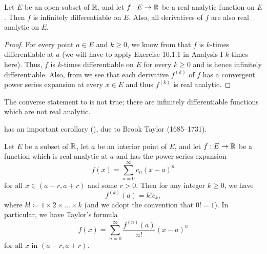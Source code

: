 \begin{cor}\label{ii:4.2.7}
  Let \(E\) be an open subset of \(\mathbb{R}\), and let \(f : E \to \mathbb{R}\) be a real analytic function on \(E\).
  Then \(f\) is infinitely differentiable on \(E\).
  Also, all derivatives of \(f\) are also real analytic on \(E\).
\end{cor}

\begin{proof}
  For every point \(a \in E\) and \(k \geq 0\), we know from  that \(f\) is \(k\)-times differentiable at \(a\)
  (we will have to apply Exercise 10.1.1 in Analysis I \(k\) times here).
  Thus, \(f\) is \(k\)-times differentiable on \(E\) for every \(k \geq 0\) and is hence infinitely differentiable.
  Also, from  we see that each derivative \(f^{(k)}\) of \(f\) has a convergent power series expansion at every \(x \in E\) and thus \(f^{(k)}\) is real analytic.
\end{proof}

\setcounter{thm}{8}
\begin{rmk}\label{ii:4.2.9}
  The converse statement to  is not true;
  there are infinitely differentiable functions which are not real analytic.
\end{rmk}

\begin{note}
   has an important corollary (), due to Brook Taylor (1685--1731).
\end{note}

\begin{cor}\label{ii:4.2.10}
  Let \(E\) be a subset of \(\mathbb{R}\), let \(a\) be an interior point of \(E\), and let \(f : E \to \mathbb{R}\) be a function which is real analytic at \(a\) and has the power series expansion
  \[
    f(x) = \sum_{n = 0}^\infty c_n (x - a)^n
  \]
  for all \(x \in (a - r, a + r)\) and some \(r > 0\).
  Then for any integer \(k \geq 0\), we have
  \[
    f^{(k)}(a) = k! c_k,
  \]
  where \(k! \coloneqq 1 \times 2 \times \dots \times k\)
  (and we adopt the convention that \(0! = 1\)).
  In particular, we have Taylor's formula
  \[
    f(x) = \sum_{n = 0}^\infty \dfrac{f^{(n)}(a)}{n!} (x - a)^n
  \]
  for all \(x\) in \((a - r, a + r)\).
\end{cor}

